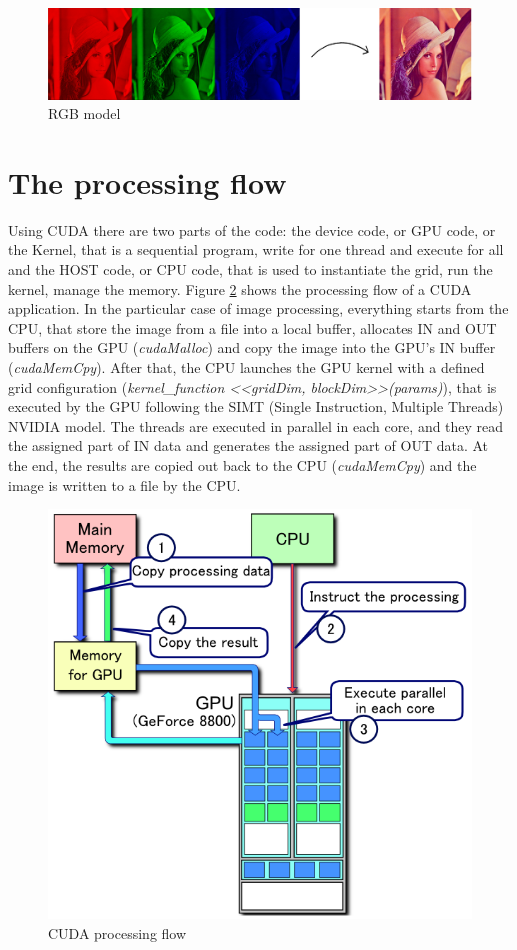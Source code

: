 \documentclass[a4paper]{article}
\begin{document}
\begin{figure}[!ht]
    \centering
    \includegraphics[width=0.7\linewidth]{rgb}
    \caption{RGB model}
    \label{fig:rgb}
\end{figure}
\FloatBarrier

\section{The processing flow}
\label{sec:cpf}
Using CUDA there are two parts of the code: the device code, or GPU code, or the Kernel, that is a sequential program, write for one thread and execute for all and the HOST code, or CPU code, that is used to instantiate the grid, run the kernel, manage the memory. Figure \ref{fig:flow} shows the processing flow of a CUDA application. In the particular case of image processing, everything starts from the CPU, that store the image from a file into a local buffer, allocates IN and OUT buffers on the GPU (\textit{cudaMalloc}) and copy the image into the GPU's IN buffer (\textit{cudaMemCpy}). After that, the CPU launches the GPU kernel with a defined grid configuration (\textit{kernel\_function <<gridDim, blockDim>>(params)}), that is executed by the GPU following the SIMT (Single Instruction, Multiple Threads) NVIDIA model. The threads are executed in parallel in each core, and they read the assigned part of IN data and generates the assigned part of OUT data. At the end, the results are copied out back to the CPU (\textit{cudaMemCpy}) and the image is written to a file by the CPU.

\begin{figure}[!ht]
    \centering
    \includegraphics[width=0.5\linewidth]{flow}
    \caption{CUDA processing flow}
    \label{fig:flow}
\end{figure}
\FloatBarrier
\end{document}
